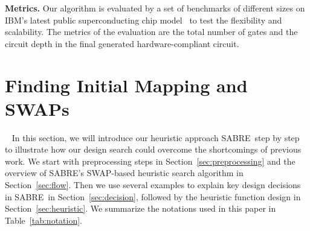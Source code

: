 \documentclass[journal,10pt,twocolumn]{IEEEtran}
\newcommand{\myalgorithmname}{SABRE}
\begin{document}
\textbf{Metrics.} 
Our algorithm is evaluated by a set of benchmarks of different sizes on IBM's latest public superconducting chip model~\cite{IBMdevice} to test the flexibility and scalability. The metrics of the evaluation are the total number of gates and the circuit depth in the final generated hardware-compliant circuit.













\section{Finding Initial Mapping and SWAPs}~\label{sec:methodology}
In this section, we will introduce our heuristic approach \myalgorithmname~step by step to illustrate how our design search could overcome the shortcomings of previous work. 
We start with preprocessing steps in Section~\ref{sec:preprocessing} and the overview of \myalgorithmname's SWAP-based heuristic search algorithm in Section~\ref{sec:flow}. Then we use several examples to explain key design decisions in \myalgorithmname~in Section~\ref{sec:decision}, followed by the heuristic function design in Section~\ref{sec:heuristic}.
We summarize the notations used in this paper in Table~\ref{tab:notation}.
\end{document}
